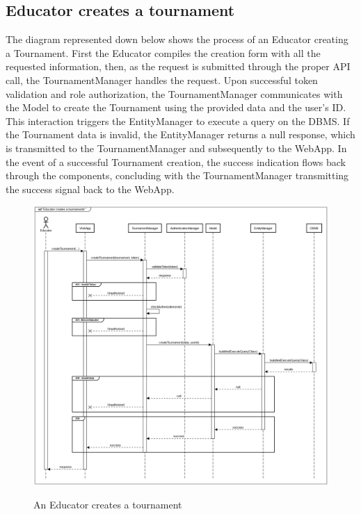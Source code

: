\documentclass{Configuration_Files/Template}
\begin{document}
\subsection*{Educator creates a tournament }

The diagram represented down below shows the process of an Educator creating a Tournament. First the Educator compiles the creation form with all the requested information, then, as the request is submitted through the proper API call, the TournamentManager handles the request. Upon successful token validation and role authorization, the TournamentManager communicates with the Model to create the Tournament using the provided data and the user's ID. This interaction triggers the EntityManager to execute a query on the DBMS. If the Tournament data is invalid, the EntityManager returns a null response, which is transmitted to the TournamentManager and subsequently to the WebApp. In the event of a successful Tournament creation, the success indication flows back through the components, concluding with the TournamentManager transmitting the success signal back to the WebApp.

\begin{figure}[H]
\centering
\includegraphics[scale = 0.33]{Images/diagrams/sequences/createTournament.png}\\
\caption{An Educator creates a tournament }
\end{figure}
\end{document}

